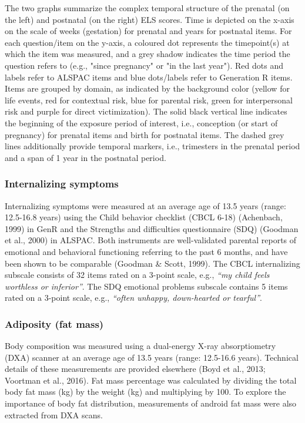 \documentclass[
  letterpaper,
  DIV=11,
  numbers=noendperiod]{scrreport}
\newenvironment{fakecaption}
{
  \begingroup
  \small\itshape\color{gray}
  \setlength{\parskip}{5pt} %
  \setlength{\leftskip}{60pt} %
  \setlength{\rightskip}{0pt} %
}
{
  \par
  \endgroup
}
\begin{document}
\begin{fakecaption}
The two graphs summarize the complex temporal structure of the prenatal (on the left) and postnatal (on the right) ELS scores. Time is depicted on the x-axis on the scale of weeks (gestation) for prenatal and years for postnatal items. For each question/item on the y-axis, a coloured dot represents the timepoint(s) at which the item was measured, and a grey shadow indicates the time period the question refers to (e.g., "since pregnancy" or "in the last year"). Red dots and labels refer to ALSPAC items and blue dots/labels refer to Generation R items. Items are grouped by domain, as indicated by the background color (yellow for life events, red for contextual risk, blue for parental risk, green for interpersonal risk and purple for direct victimization). The solid black vertical line indicates the beginning of the exposure period of interest, i.e., conception (or start of pregnancy) for prenatal items and birth for postnatal items. The dashed grey lines additionally provide temporal markers, i.e., trimesters in the prenatal period and a span of 1 year in the postnatal period.
\end{fakecaption}

\subsubsection{Internalizing symptoms}\label{internalizing-symptoms}

Internalizing symptoms were measured at an average age of 13.5 years
(range: 12.5-16.8 years) using the Child behavior checklist (CBCL 6-18)
(Achenbach, 1999) in GenR and the Strengths and difficulties
questionnaire (SDQ) (Goodman et al., 2000) in ALSPAC. Both instruments
are well-validated parental reports of emotional and behavioral
functioning referring to the past 6 months, and have been shown to be
comparable (Goodman \& Scott, 1999). The CBCL internalizing subscale
consists of 32 items rated on a 3-point scale, e.g., \emph{``my child
feels worthless or inferior''}. The SDQ emotional problems subscale
contains 5 items rated on a 3-point scale, e.g., \emph{``often unhappy,
down-hearted or tearful''}.

\subsubsection{Adiposity (fat mass)}\label{adiposity-fat-mass}

Body composition was measured using a dual-energy X-ray absorptiometry
(DXA) scanner at an average age of 13.5 years (range: 12.5-16.6 years).
Technical details of these measurements are provided elsewhere (Boyd et
al., 2013; Voortman et al., 2016). Fat mass percentage was calculated by
dividing the total body fat mass (kg) by the weight (kg) and multiplying
by 100. To explore the importance of body fat distribution, measurements
of android fat mass were also extracted from DXA scans.
\end{document}
